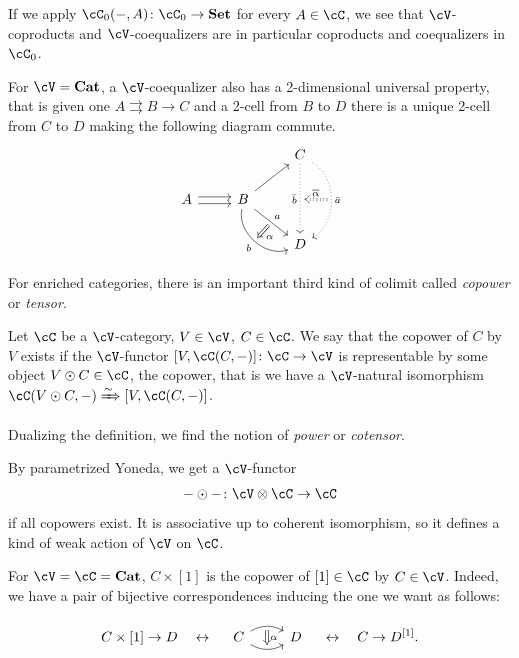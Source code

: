 \documentclass[a4paper,11pt,oneside,openany]{scrbook}
\begin{document}
\begin{rmk}
	If we apply $\cC_0(-,A)\colon\cC_0\rightarrow\Set$ for every $A\in\cC$, we
    see that $\cV$-coproducts and $\cV$-coequalizers are in particular
    coproducts and coequalizers in $\cC_0$.
\end{rmk}

\begin{exmp}
	For $\cV=\Cat$, a $\cV$-coequalizer also has a 2-dimensional universal property, that is given one $A\rightrightarrows B\rightarrow C$ and a 2-cell from $B$ to $D$ there is a unique 2-cell from $C$ to $D$ making the following diagram commute.
	\[
		\begin{tikzcd}
			&& C\ar[dd, dotted, swap, "\bar{b}", ""{name=bbar}]\ar[dd, dotted, bend left=60, "\bar{a}", ""{name=abar}] \\
			A\ar[r, shift left,]\ar[r, shift right]
			& B\ar[ur]\ar[dr, "a", ""{name=a}]\ar[dr, bend right=60, swap, "b", ""{name=b}] \\
			&& D
			\ar[Rightarrow, shorten <= .3em, shorten >= .3em, from=a, to=b, "\alpha"]
			\ar[Rightarrow, dotted, shorten <= .3em, shorten >= .3em, swap, from=abar, to=bbar, "\overline{\alpha}"]
		\end{tikzcd}
	\]
\end{exmp}

For enriched categories, there is an important third kind of colimit called \emph{copower} or \emph{tensor}.

\begin{defn}
	Let $\cC$ be a $\cV$-category, $V\in\cV$, $C\in\cC$. We say that the copower of $C$ by $V$ exists if the $\cV$-functor $[V,\cC(C,-)]\colon\cC\rightarrow\cV$ is representable by some object $V\odot C\in\cC$, the copower, that is we have a $\cV$-natural isomorphism $\cC(V\odot C,-)\xRightarrow{\sim}[V,\cC(C,-)]$.

	Dualizing the definition, we find the notion of \emph{power} or \emph{cotensor}.
\end{defn}

\begin{rmk}
	By parametrized Yoneda, we get a $\cV$-functor$$-\odot-\colon\cV\otimes\cC\rightarrow\cC$$if all copowers exist. It is associative up to coherent isomorphism, so it defines a kind of weak action of $\cV$ on $\cC$.
\end{rmk}

\begin{exmp}
    For $\cV=\cC=\Cat$, $C\times[1]$ is the copower of $[1]\in\cC$ by $C\in\cV$. Indeed, we have a pair of bijective correspondences inducing the one we want as follows:

	$$C\times[1]\rightarrow D\quad\leftrightarrow\quad
		\begin{tikzcd}
			C\ar[r, bend left, ""{name=A}]\ar[r, bend right, swap, ""{name=B}]
			& D
			\ar[Rightarrow, shorten <= .3em, shorten >= .3em, from=A, to=B, "\alpha"]
		\end{tikzcd}
		\quad\leftrightarrow\quad C\rightarrow D^{[1]}.$$
\end{exmp}
\end{document}
